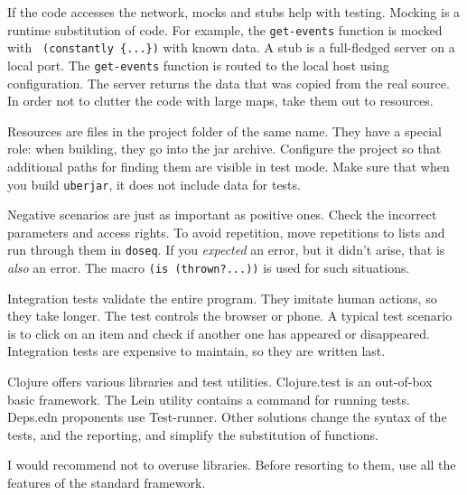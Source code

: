 If the code accesses the network, mocks and stubs help with testing. Mocking is a runtime substitution of code. For example, the \verb|get-events| function is mocked with \verb| (constantly {...})| with known data. A stub is a full-fledged server on a local port. The \verb|get-events| function is routed to the local host using configuration. The server returns the data that was copied from the real source. In order not to clutter the code with large maps, take them out to resources.

Resources are files in the project folder of the same name. They have a special role: when building, they go into the jar archive. Configure the project so that additional paths for finding them are visible in test mode. Make sure that when you build \verb|uberjar|, it does not include data for tests.

Negative scenarios are just as important as positive ones. Check the incorrect parameters and access rights. To avoid repetition, move repetitions to lists and run through them in \verb|doseq|. If you \emph{expected} an error, but it didn't arise, that is \emph{also} an error. The macro \verb|(is (thrown?...))| is used for such situations.

Integration tests validate the entire program. They imitate human actions, so they take longer. The test controls the browser or phone. A typical test scenario is to click on an item and check if another one has appeared or disappeared. Integration tests are expensive to maintain, so they are written last.

Clojure offers various libraries and test utilities. Clojure.test is an out-of-box basic framework. The Lein utility contains a command for running tests. Deps.edn proponents use Test-runner. Other solutions change the syntax of the tests, and the reporting, and simplify the substitution of functions.

I would recommend not to overuse libraries. Before resorting to them, use all the features of the standard framework.
